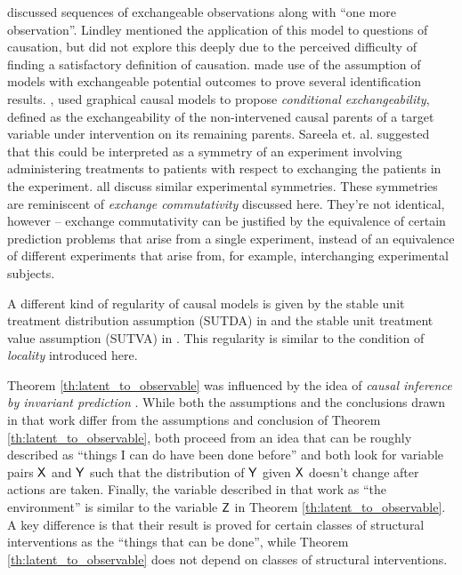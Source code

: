 \documentclass{article}
\begin{document}
\citet{lindley_role_1981} discussed sequences of exchangeable observations along with ``one more observation''. Lindley mentioned the application of this model to questions of causation, but did not explore this deeply due to the perceived difficulty of finding a satisfactory definition of causation. \citet{rubin_causal_2005, imbens_causal_2015} made use of the assumption of models with exchangeable potential outcomes to prove several identification results. \citet{saarela_role_2020}, used graphical causal models to propose \emph{conditional exchangeability}, defined as the exchangeability of the non-intervened causal parents of a target variable under intervention on its remaining parents. Sareela et. al. suggested that this could be interpreted as a symmetry of an experiment involving administering treatments to patients with respect to exchanging the patients in the experiment. \citet{hernan_estimating_2006,hernan_beyond_2012,greenland_identifiability_1986,banerjee_chapter_2017,dawid_decision-theoretic_2020} all discuss similar experimental symmetries. These symmetries are reminiscent of \emph{exchange commutativity} discussed here. They're not identical, however -- exchange commutativity can be justified by the equivalence of certain prediction problems that arise from a single experiment, instead of an equivalence of different experiments that arise from, for example, interchanging experimental subjects.

A different kind of regularity of causal models is given by the stable unit treatment distribution assumption (SUTDA) in \citet{dawid_decision-theoretic_2020} and the stable unit treatment value assumption (SUTVA) in \citep{rubin_causal_2005}. This regularity is similar to the condition of \emph{locality} introduced here.

Theorem \ref{th:latent_to_observable} was influenced by the idea of \emph{causal inference by invariant prediction} \citep{peters_causal_2016}. While both the assumptions and the conclusions drawn in that work differ from the assumptions and conclusion of Theorem \ref{th:latent_to_observable}, both proceed from an idea that can be roughly described as ``things I can do have been done before'' and both look for variable pairs $\mathsf{X}$ and $\mathsf{Y}$ such that the distribution of $\mathsf{Y}$ given $\mathsf{X}$ doesn't change after actions are taken. Finally, the variable described in that work as ``the environment'' is similar to the variable $\mathsf{Z}$ in Theorem \ref{th:latent_to_observable}. A key difference is that their result is proved for certain classes of structural interventions as the ``things that can be done'', while Theorem \ref{th:latent_to_observable} does not depend on classes of structural interventions.
\end{document}
